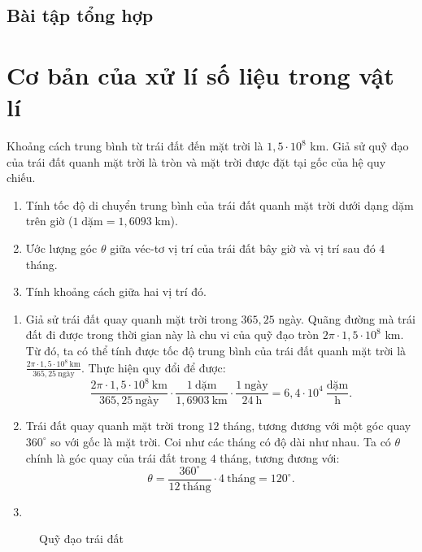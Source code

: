 \documentclass[a4paper, titlepage, openany]{book}
\newcounter{exercise}
\newcounter{solution}
\begin{document}
\section{Bài tập tổng hợp}


\chapter{Cơ bản của xử lí số liệu trong vật lí}
\exercise Khoảng cách trung bình từ trái đất đến mặt trời là $1{,}5 \cdot 10^8$ km. Giả sử quỹ đạo của trái đất quanh mặt trời là tròn và mặt trời được đặt tại gốc của hệ quy chiếu.
\begin{enumerate}
   \item Tính tốc độ di chuyển trung bình của trái đất quanh mặt trời dưới dạng dặm trên giờ ($1 \;\text{dặm}=1{,}6093\;\text{km}$).
   \item Ước lượng góc $\theta$ giữa véc-tơ vị trí của trái đất bây giờ và vị trí sau đó $4$ tháng.
   \item Tính khoảng cách giữa hai vị trí đó.
\end{enumerate}
\solution
\begin{enumerate}
   \item Giả sử trái đất quay quanh mặt trời trong $365{,}25$ ngày. Quãng đường mà trái đất đi được trong thời gian này là chu vi của quỹ đạo tròn $2 \pi \cdot 1{,}5 \cdot 10^8$ km. Từ đó, ta có thể tính được tốc độ trung bình của trái đất quanh mặt trời là $\frac{2 \pi \cdot 1{,}5 \cdot 10^8\ \text{km}}{365{,}25\ \text{ngày}}$. Thực hiện quy đổi để được:
      \[
         \frac{2 \pi \cdot 1{,}5 \cdot 10^8\ \text{km}}{365{,}25\ \text{ngày}}
         \cdot \frac{1\ \text{dặm}}{1{,}6903\ \text{km}}
         \cdot \frac{1\ \text{ngày}}{24\ \text{h}}
         = \boxed{6{,}4\cdot 10^4\ \frac{\text{dặm}}{\text{h}}}.
      \]
   \item Trái đất quay quanh mặt trời trong $12$ tháng, tương đương với một góc quay $360^{\circ}$ so với gốc là mặt trời. Coi như các tháng có độ dài như nhau. Ta có $\theta$ chính là góc quay của trái đất trong $4$ tháng, tương đương với:
   \[
      \theta = \frac{360^{\circ}}{12\ \text{tháng}} \cdot 4\ \text{tháng}= \boxed{120^{\circ}}.
   \]
   \item
\end{enumerate}

\begin{wrapfigure}{r}{0.3\textwidth}
   \centering
   \caption{Quỹ đạo trái đất}
   \label{fig:earth}
\end{wrapfigure}
\end{document}
